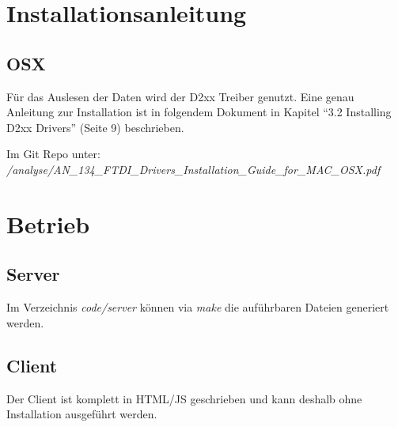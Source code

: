 \section{Installationsanleitung}
\subsection{OSX}
Für das Auslesen der Daten wird der D2xx Treiber genutzt. Eine genau Anleitung zur Installation ist in folgendem Dokument in Kapitel "`3.2 Installing D2xx Drivers"' (Seite 9) beschrieben.

Im Git Repo unter:\\
\textit{/analyse/AN\_134\_FTDI\_Drivers\_Installation\_Guide\_for\_MAC\_OSX.pdf}


\section{Betrieb}
\subsection{Server}
Im Verzeichnis \textit{code/server} können via \textit{make} die auführbaren Dateien generiert werden.

\subsection{Client}
Der Client ist komplett in HTML/JS geschrieben und kann deshalb ohne Installation ausgeführt werden.


